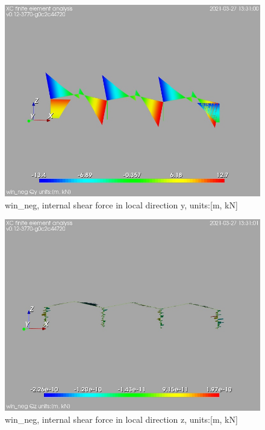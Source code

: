 \begin{figure}
\begin{center}
\includegraphics[width=\linewidth]{calc_results/sole_zeinali/text/graphics/resSimplLC/win_negallMemberSetQy}
\caption{win_neg, internal shear force in local direction y, units:[m, kN]}
\end{center}
\end{figure}
\begin{figure}
\begin{center}
\includegraphics[width=\linewidth]{calc_results/sole_zeinali/text/graphics/resSimplLC/win_negallMemberSetQz}
\caption{win_neg, internal shear force in local direction z, units:[m, kN]}
\end{center}
\end{figure}
